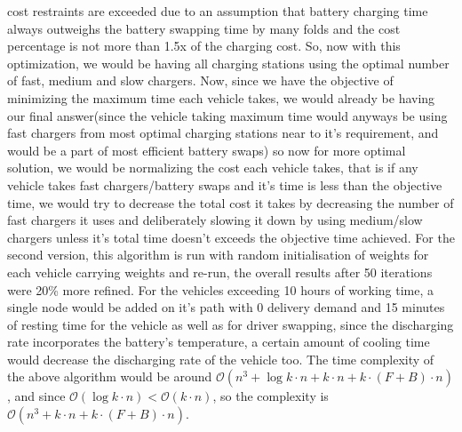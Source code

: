 \documentclass[conference]{IEEEtran}
\begin{document}
cost restraints are exceeded due to an assumption that battery charging time always outweighs the battery swapping time by many folds and the cost percentage is not more than 1.5x of the charging cost. So, now with this optimization, we would be having all charging stations using the optimal number of fast, medium and slow chargers. Now, since we have the objective of minimizing the maximum time each vehicle takes, we would already be having our final answer(since the vehicle taking maximum time would anyways be using fast chargers from most optimal charging stations near to it's requirement, and would be a part of most efficient battery swaps) so now for more optimal solution, we would be normalizing the cost each vehicle takes, that is if any vehicle takes fast chargers/battery swaps and it's time is less than the objective time, we would try to decrease the total cost it takes by decreasing the number of fast chargers it uses and deliberately slowing it down by using medium/slow chargers unless it's total time doesn't exceeds the objective time achieved.
For the second version, this algorithm is run with random initialisation of weights for each vehicle carrying weights and re-run, the overall results after 50 iterations were 20\% more refined.
For the vehicles exceeding 10 hours of working time, a single node would be added on it's path with 0 delivery demand and 15 minutes of resting time for the vehicle as well as for driver swapping, since the discharging rate incorporates the battery's temperature, a certain amount of cooling time would decrease the discharging rate of the vehicle too. 
The time complexity of the above algorithm would be around $\mathcal{O}(n^3 + \log k \cdot n + k \cdot n+ k \cdot (F+B) \cdot n)$, and since $\mathcal{O}(\log k \cdot n) < \mathcal{O}(k \cdot n)$, so the complexity is $\mathcal{O}(n^3 + k \cdot n+ k \cdot (F+B) \cdot n)$.


   
\end{document}
